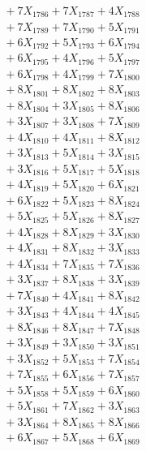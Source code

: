 \documentclass[a4paper,10pt]{article}
\begin{document}
{\begin{align}
&\;  + 7 X_{1786} + 7 X_{1787} + 4 X_{1788} \\[0.3ex]
&\;  + 7 X_{1789} + 7 X_{1790} + 5 X_{1791} \\[0.3ex]
&\;  + 6 X_{1792} + 5 X_{1793} + 6 X_{1794} \\[0.3ex]
&\;  + 6 X_{1795} + 4 X_{1796} + 5 X_{1797} \\[0.3ex]
&\;  + 6 X_{1798} + 4 X_{1799} + 7 X_{1800} \\[0.3ex]
&\;  + 8 X_{1801} + 8 X_{1802} + 8 X_{1803} \\[0.3ex]
&\;  + 8 X_{1804} + 3 X_{1805} + 8 X_{1806} \\[0.3ex]
&\;  + 3 X_{1807} + 3 X_{1808} + 7 X_{1809} \\[0.5ex]\allowbreak
&\;  + 4 X_{1810} + 4 X_{1811} + 8 X_{1812} \\[0.3ex]
&\;  + 3 X_{1813} + 5 X_{1814} + 3 X_{1815} \\[0.3ex]
&\;  + 3 X_{1816} + 5 X_{1817} + 5 X_{1818} \\[0.3ex]
&\;  + 4 X_{1819} + 5 X_{1820} + 6 X_{1821} \\[0.3ex]
&\;  + 6 X_{1822} + 5 X_{1823} + 8 X_{1824} \\[0.3ex]
&\;  + 5 X_{1825} + 5 X_{1826} + 8 X_{1827} \\[0.3ex]
&\;  + 4 X_{1828} + 8 X_{1829} + 3 X_{1830} \\[0.3ex]
&\;  + 4 X_{1831} + 8 X_{1832} + 3 X_{1833} \\[0.3ex]
&\;  + 4 X_{1834} + 7 X_{1835} + 7 X_{1836} \\[0.3ex]
&\;  + 3 X_{1837} + 8 X_{1838} + 3 X_{1839} \\[0.5ex]\allowbreak
&\;  + 7 X_{1840} + 4 X_{1841} + 8 X_{1842} \\[0.3ex]
&\;  + 3 X_{1843} + 4 X_{1844} + 4 X_{1845} \\[0.3ex]
&\;  + 8 X_{1846} + 8 X_{1847} + 7 X_{1848} \\[0.3ex]
&\;  + 3 X_{1849} + 3 X_{1850} + 3 X_{1851} \\[0.3ex]
&\;  + 3 X_{1852} + 5 X_{1853} + 7 X_{1854} \\[0.3ex]
&\;  + 7 X_{1855} + 6 X_{1856} + 7 X_{1857} \\[0.3ex]
&\;  + 5 X_{1858} + 5 X_{1859} + 6 X_{1860} \\[0.3ex]
&\;  + 5 X_{1861} + 7 X_{1862} + 3 X_{1863} \\[0.3ex]
&\;  + 3 X_{1864} + 8 X_{1865} + 8 X_{1866} \\[0.3ex]
&\;  + 6 X_{1867} + 5 X_{1868} + 6 X_{1869} \\[0.5ex]\allowbreak

\end{align}}
\end{document}
